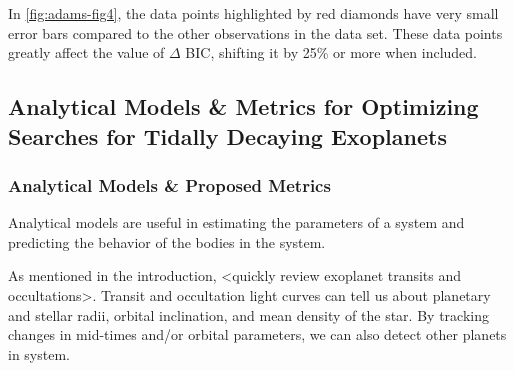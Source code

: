 \documentclass[oneside,12pt]{amsart}
\numberwithin{page}{section}
\begin{document}
In \ref{fig:adams-fig4}, the data points highlighted by red diamonds have very small error bars compared to the other observations in the data set. These data points greatly affect the value of $\Delta$ BIC, shifting it by 25\% or more when included.







\subsection{Analytical Models \& Metrics for Optimizing Searches for Tidally Decaying Exoplanets}\label{sec:models}

\subsubsection{Analytical Models \& Proposed Metrics}

Analytical models are useful in estimating the parameters of a system and predicting the behavior of the bodies in the system. 

As mentioned in the introduction, <quickly review exoplanet transits and occultations>. Transit and occultation light curves can tell us about planetary and stellar radii, orbital inclination, and mean density of the star. By tracking changes in mid-times and/or orbital parameters, we can also detect other planets in system.
\end{document}
